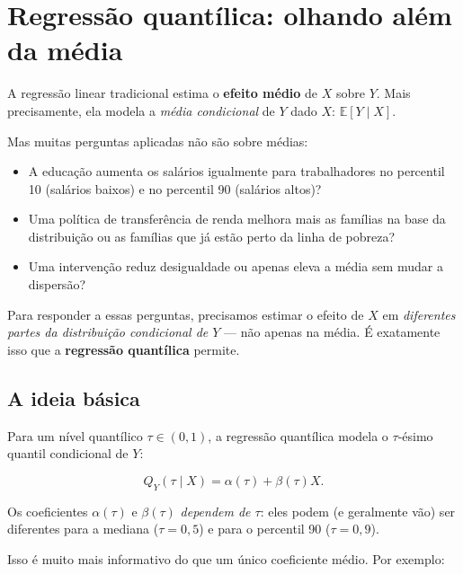 \chapter{Regressão quantílica: olhando além da média}

A regressão linear tradicional estima o \textbf{efeito médio} de $X$ sobre $Y$. Mais
precisamente, ela modela a \emph{média condicional} de $Y$ dado $X$:
$\mathbb{E}[Y \mid X]$.

Mas muitas perguntas aplicadas não são sobre médias:

\begin{itemize}
  \item A educação aumenta os salários igualmente para trabalhadores no percentil 10
  (salários baixos) e no percentil 90 (salários altos)?
  \item Uma política de transferência de renda melhora mais as famílias na base da
  distribuição ou as famílias que já estão perto da linha de pobreza?
  \item Uma intervenção reduz desigualdade ou apenas eleva a média sem mudar a dispersão?
\end{itemize}

Para responder a essas perguntas, precisamos estimar o efeito de $X$ em
\emph{diferentes partes da distribuição condicional de $Y$} --- não apenas na média.
É exatamente isso que a \textbf{regressão quantílica} \citep{koenker_regression_1978}
permite.

\section*{A ideia básica}

Para um nível quantílico $\tau \in (0,1)$, a regressão quantílica modela o
$\tau$-ésimo quantil condicional de $Y$:

\begin{equation}
Q_Y(\tau \mid X) = \alpha(\tau) + \beta(\tau) X.
\label{eq:qr}
\end{equation}

\noindent
Os coeficientes $\alpha(\tau)$ e $\beta(\tau)$ \emph{dependem de $\tau$}: eles podem
(e geralmente vão) ser diferentes para a mediana ($\tau = 0{,}5$) e para o percentil
90 ($\tau = 0{,}9$).

Isso é muito mais informativo do que um único coeficiente médio. Por exemplo:

